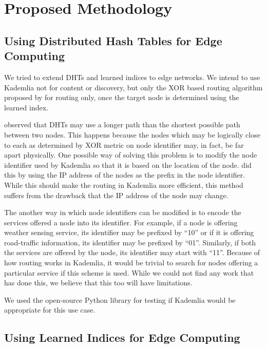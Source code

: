 \chapter{Proposed Methodology}

\section{Using Distributed Hash Tables for Edge Computing}

We tried to extend DHTs and learned indices to edge networks. We intend to use
Kademlia not for content or discovery, but only the XOR based routing algorithm
proposed by \citet{petarmaymounkovKademliaPeertoPeerInformation2002} for routing
only, once the target node is determined using the learned index.

\citet{xieEfficientIndexingMechanism2019} observed that DHTs may use a longer
path than the shortest possible path between two nodes. This happens because the
nodes which may be logically close to each as determined by XOR metric on node
identifier may, in fact, be far apart physically. One possible way of solving
this problem is to modify the node identifier used by Kademlia so that it is
based on the location of the node. \citet{mengweiImprovementKademliaBased2013}
did this by using the IP address of the nodes as the prefix in the node
identifier. While this should make the routing in Kademlia more efficient, this
method suffers from the drawback that the IP address of the node may change.

The another way in which node identifiers can be modified is to encode the
services offered a node into its identifier. For example, if a node is offering
weather sensing service, its identifier may be prefixed by ``10'' or if it is
offering road-traffic information, its identifier may be prefixed by ``01''.
Similarly, if both the services are offered by the node, its identifier may
start with ``11''. Because of how routing works in Kademlia, it would be trivial
to search for nodes offering a particular service if this scheme is used. While
we could not find any work that has done this, we believe that this too will
have limitations.

We used the open-source Python library for testing if Kademlia would be
appropriate for this use case. \cite{KademliaIndexRst}

\section{Using Learned Indices for Edge Computing}

